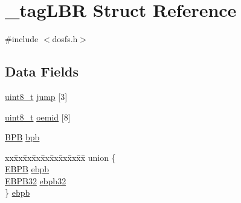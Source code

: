 \hypertarget{struct__tag_l_b_r}{\section{\-\_\-tag\-L\-B\-R Struct Reference}
\label{struct__tag_l_b_r}
}


{\ttfamily \#include $<$dosfs.\-h$>$}

\subsection*{Data Fields}
\begin{DoxyCompactItemize}
\item 
\hyperlink{stdint_8h_aba7bc1797add20fe3efdf37ced1182c5}{uint8\-\_\-t} \hyperlink{struct__tag_l_b_r_ab0f59cb4457c23b8644896990cfde9fa}{jump} \mbox{[}3\mbox{]}
\item 
\hyperlink{stdint_8h_aba7bc1797add20fe3efdf37ced1182c5}{uint8\-\_\-t} \hyperlink{struct__tag_l_b_r_a014fa7053028c54af3aafa297b1ab734}{oemid} \mbox{[}8\mbox{]}
\item 
\hyperlink{_common_2_libraries_2dosfs_2dosfs_8h_a2a8ce2c3f436db08ee3e5c243f25353a}{B\-P\-B} \hyperlink{struct__tag_l_b_r_a018f4a41ea5bf12d345994ace8d7a50d}{bpb}
\item 
\begin{tabbing}
xx\=xx\=xx\=xx\=xx\=xx\=xx\=xx\=xx\=\kill
union \{\\
\>\hyperlink{_common_2_libraries_2dosfs_2dosfs_8h_acce75b7d2a392a5262bc29026cf1d663}{EBPB} \hyperlink{struct__tag_l_b_r_a86d3372f818b659d2031640876756593}{ebpb}\\
\>\hyperlink{_common_2_libraries_2dosfs_2dosfs_8h_a32a707d601d48ab1403bb197255f54f3}{EBPB32} \hyperlink{struct__tag_l_b_r_a2998f055db7d2eb2020271037630d3d3}{ebpb32}\\
\} \hyperlink{struct__tag_l_b_r_a75f624210b6728a97ed21dcac0dfb4fd}{ebpb}\\


\end{tabbing}
\end{DoxyCompactItemize}
